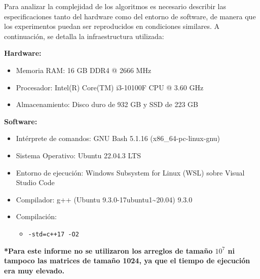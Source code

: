 Para analizar la complejidad de los algoritmos es necesario describir las especificaciones tanto del hardware como del entorno de software, de manera que los experimentos puedan ser reproducidos en condiciones similares. A continuación, se detalla la infraestructura utilizada:

\textbf{Hardware:}
\begin{itemize}
    \item Memoria RAM: 16 GB DDR4 @ 2666 MHz
    \item Procesador: Intel(R) Core(TM) i3-10100F CPU @ 3.60 GHz
    \item Almacenamiento: Disco duro de 932 GB y SSD de 223 GB
\end{itemize}

\textbf{Software:}
\begin{itemize}
    \item Intérprete de comandos: GNU Bash 5.1.16 (x86\_64-pc-linux-gnu)
    \item Sistema Operativo: Ubuntu 22.04.3 LTS
    \item Entorno de ejecución: Windows Subsystem for Linux (WSL) sobre Visual Studio Code
    \item Compilador: g++ (Ubuntu 9.3.0-17ubuntu1\textasciitilde20.04) 9.3.0
    \item Compilación: 
    \begin{itemize}
        \item \texttt{-std=c++17 -O2}
    \end{itemize}
\end{itemize}



\textbf{*Para este informe no se utilizaron los arreglos de tamaño $10^7$ ni tampoco las matrices de tamaño 1024, ya que el tiempo de ejecución era muy elevado.} \\

